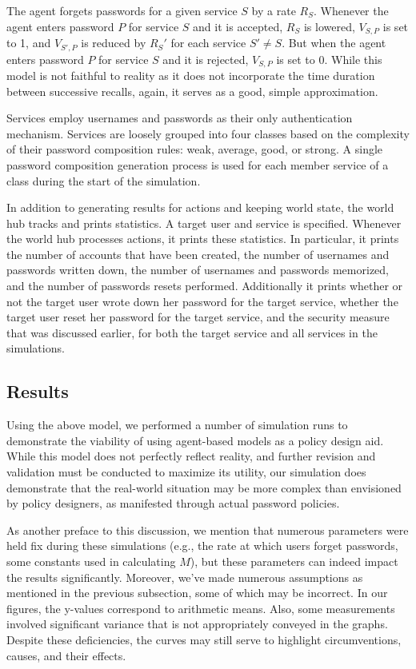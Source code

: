 \documentclass[conference]{IEEEtran}
\begin{document}
{The agent forgets passwords for a given service $S$ by a rate $R_S$. 
Whenever the agent enters  password $P$ for service $S$ and it is accepted, 
$R_S$ is lowered, $V_{S, P}$ is set to 1, and $V_{S', P}$ is reduced by 
$R_S'$ for each service $S' \neq S$. But when the agent enters password $P$ 
for service $S$ and it is rejected, $V_{S, P}$ is set to 0. While this model is 
not faithful to reality as it does not incorporate the time duration between 
successive recalls, again, it serves as a good, simple approximation.

Services employ usernames and passwords as their only 
authentication mechanism. Services are loosely grouped into four classes 
based on the complexity of their password composition rules: weak, average, 
good, or strong. A single password composition generation process is used for 
each member service of a class during the start of the simulation.

In addition to generating results for actions and keeping world state, 
the world hub tracks and prints statistics. A target user and service is 
specified. Whenever the world hub processes actions, it 
prints these statistics. In 
particular, it prints the number of accounts that have been created, the number 
of usernames and passwords written down, the number of usernames and passwords 
memorized, and the number of passwords resets performed. Additionally it prints 
whether or not the target user wrote down her password for the target service, whether 
the target user reset her password for the target service, and the security measure that 
was discussed earlier, for both the target service and all services in the simulations. 

\subsection{Results}

Using the above model, we performed a number of simulation runs to
demonstrate the viability of using agent-based models as a policy
design aid. While this model does not perfectly reflect reality, and
further revision and validation must be conducted to maximize its
utility, our simulation does demonstrate that the real-world situation
may be more complex than envisioned by policy designers, as manifested
through actual password policies. 

As another preface to this discussion, we mention that numerous parameters 
were held fix during these simulations (e.g., the rate at which users 
forget passwords, some constants used in calculating $M$), but these parameters 
can indeed impact the results significantly. Moreover, we've made numerous 
assumptions as mentioned in the previous subsection, some of which may be 
incorrect. In our figures, the y-values correspond to arithmetic means. Also, some 
measurements involved significant variance that is not appropriately conveyed in 
the graphs. Despite these deficiencies, the curves may still serve to highlight 
circumventions, causes, and their effects.

}
\end{document}
